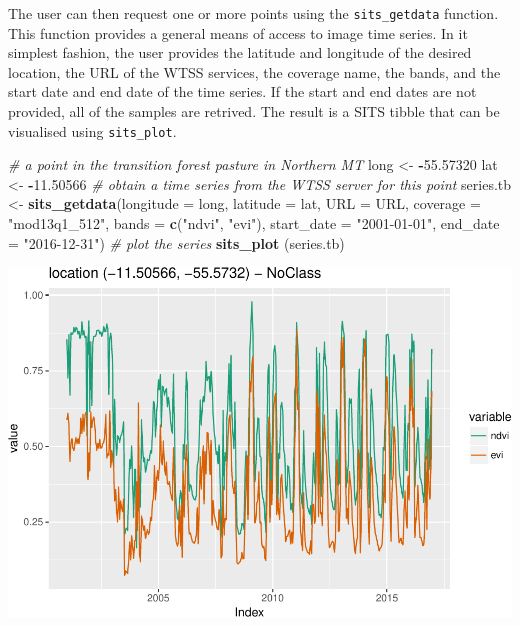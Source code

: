 \documentclass[11pt,]{article}
\newenvironment{Shaded}{\begin{snugshade}}{\end{snugshade}}
\newcommand{\KeywordTok}[1]{\textcolor[rgb]{0.13,0.29,0.53}{\textbf{#1}}}
\newcommand{\DataTypeTok}[1]{\textcolor[rgb]{0.13,0.29,0.53}{#1}}
\newcommand{\FloatTok}[1]{\textcolor[rgb]{0.00,0.00,0.81}{#1}}
\newcommand{\StringTok}[1]{\textcolor[rgb]{0.31,0.60,0.02}{#1}}
\newcommand{\CommentTok}[1]{\textcolor[rgb]{0.56,0.35,0.01}{\textit{#1}}}
\newcommand{\OperatorTok}[1]{\textcolor[rgb]{0.81,0.36,0.00}{\textbf{#1}}}
\newcommand{\NormalTok}[1]{#1}
\begin{document}
The user can then request one or more points using the
\texttt{sits\_getdata} function. This function provides a general means
of access to image time series. In it simplest fashion, the user
provides the latitude and longitude of the desired location, the URL of
the WTSS services, the coverage name, the bands, and the start date and
end date of the time series. If the start and end dates are not
provided, all of the samples are retrived. The result is a SITS tibble
that can be visualised using \texttt{sits\_plot}.

\begin{Shaded}
\begin{Highlighting}[]
\CommentTok{# a point in the transition forest pasture in Northern MT}
\NormalTok{long <-}\StringTok{ }\OperatorTok{-}\FloatTok{55.57320}
\NormalTok{lat <-}\StringTok{ }\OperatorTok{-}\FloatTok{11.50566}
\CommentTok{# obtain a time series from the WTSS server for this point}
\NormalTok{series.tb <-}\StringTok{ }\KeywordTok{sits_getdata}\NormalTok{(}\DataTypeTok{longitude =}\NormalTok{ long, }\DataTypeTok{latitude =}\NormalTok{ lat, }\DataTypeTok{URL =}\NormalTok{ URL, }
                          \DataTypeTok{coverage =} \StringTok{"mod13q1_512"}\NormalTok{, }\DataTypeTok{bands =} \KeywordTok{c}\NormalTok{(}\StringTok{"ndvi"}\NormalTok{, }\StringTok{"evi"}\NormalTok{),}
                          \DataTypeTok{start_date =} \StringTok{"2001-01-01"}\NormalTok{, }\DataTypeTok{end_date =} \StringTok{"2016-12-31"}\NormalTok{)}
\CommentTok{# plot the series}
\KeywordTok{sits_plot}\NormalTok{ (series.tb)}
\end{Highlighting}
\end{Shaded}

\includegraphics{sits_description_files/figure-latex/unnamed-chunk-14-1.pdf}
\newpage
\singlespacing

\end{document}
